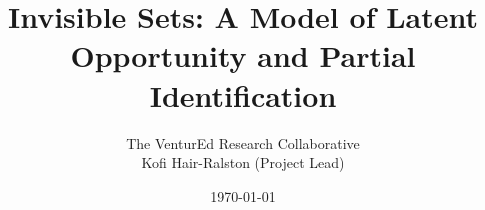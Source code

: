 \documentclass[12pt, letterpaper]{article}
\title{Invisible Sets: A Model of Latent Opportunity and Partial Identification}
\author{The VenturEd Research Collaborative \\ \small Kofi Hair-Ralston (Project Lead)}
\date{\today}
\begin{document}
\maketitle

\begin{abstract}
    
\end{abstract}

\newpage
\tableofcontents
\newpage








\newpage


\newpage
\appendix

\end{document}
